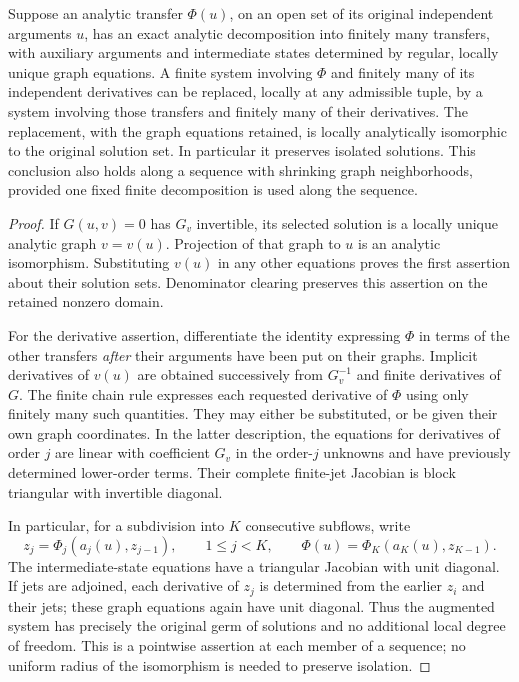 \begin{lemma}\label{lem:counting-jet-lift}
Suppose an analytic transfer $\Phi(u)$, on an open set of its original
independent arguments $u$, has an exact analytic decomposition into
finitely many transfers, with auxiliary arguments and intermediate
states determined by regular, locally unique graph equations.  A
finite system involving $\Phi$ and finitely many of its independent
derivatives can be replaced, locally at any admissible tuple, by a
system involving those transfers and finitely many of their
derivatives.  The replacement, with the graph equations retained,
is locally analytically isomorphic to the original solution set.
In particular it preserves isolated solutions.  This conclusion also
holds along a sequence with shrinking graph neighborhoods, provided
one fixed finite decomposition is used along the sequence.
\end{lemma}

\begin{proof}
If $G(u,v)=0$ has $G_v$ invertible, its selected solution is a
locally unique analytic graph $v=v(u)$.  Projection of that graph to
$u$ is an analytic isomorphism.  Substituting $v(u)$ in any other
equations proves the first assertion about their solution sets.
Denominator clearing preserves this assertion on the retained
nonzero domain.

For the derivative assertion, differentiate the identity expressing
$\Phi$ in terms of the other transfers \emph{after} their arguments
have been put on their graphs.  Implicit derivatives of $v(u)$ are
obtained successively from $G_v^{-1}$ and finite derivatives of $G$.
The finite chain rule expresses each requested derivative of $\Phi$
using only finitely many such quantities.  They may either be
substituted, or be given their own graph coordinates.  In the latter
description, the equations for derivatives of order $j$ are linear
with coefficient $G_v$ in the order-$j$ unknowns and have previously
determined lower-order terms.  Their complete finite-jet Jacobian is
block triangular with invertible diagonal.

In particular, for a subdivision into $K$ consecutive subflows,
write
\[
 z_j=\Phi_j(a_j(u),z_{j-1}),\qquad 1\le j<K,
 \qquad
 \Phi(u)=\Phi_K(a_K(u),z_{K-1}).
\]
The intermediate-state equations have a triangular Jacobian with
unit diagonal.  If jets are adjoined, each derivative of $z_j$ is
determined from the earlier $z_i$ and their jets; these graph equations
again have unit diagonal.  Thus the augmented system has precisely
the original germ of solutions and no additional local degree of
freedom.  This is a pointwise assertion at each member of a sequence;
no uniform radius of the isomorphism is needed to preserve isolation.
\end{proof}

